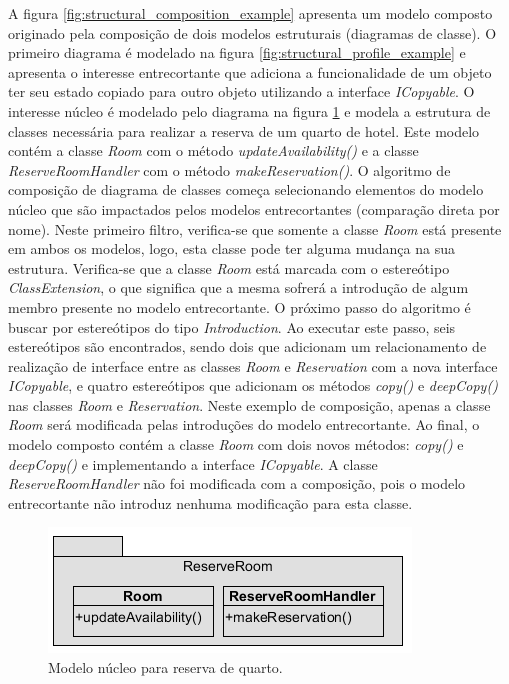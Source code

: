 A figura \ref{fig:structural_composition_example} apresenta um modelo composto originado pela composição de dois modelos estruturais (diagramas de
classe). O primeiro diagrama é modelado na figura \ref{fig:structural_profile_example} e apresenta o interesse entrecortante que adiciona a
funcionalidade de um objeto ter seu estado copiado para outro objeto utilizando a interface \textit{ICopyable}. O interesse núcleo é modelado pelo diagrama na figura
\ref{fig:structural_core_concern_class_diagram} e modela a estrutura de classes necessária para realizar a reserva de um quarto de hotel. Este
modelo contém a classe \textit{Room} com o método \textit{updateAvailability()} e a classe \textit{ReserveRoomHandler} com o
método \textit{makeReservation()}. O algoritmo de composição de diagrama de classes começa selecionando elementos do modelo núcleo que são
impactados pelos modelos entrecortantes (comparação direta por nome). Neste primeiro filtro, verifica-se que somente a classe \textit{Room} está
presente em ambos os modelos, logo, esta classe pode ter alguma mudança na sua estrutura. Verifica-se que a classe \textit{Room} está marcada com o 
estereótipo \textit{ClassExtension}, o que significa que a mesma sofrerá a introdução de algum membro presente no modelo entrecortante. O próximo
passo do algoritmo é buscar por estereótipos do tipo \textit{Introduction}. Ao executar este passo, seis estereótipos são encontrados, sendo dois
que adicionam um relacionamento de realização de interface entre as classes \textit{Room} e \textit{Reservation} com a nova interface
\textit{ICopyable}, e quatro estereótipos que adicionam os métodos \textit{copy()} e \textit{deepCopy()} nas classes \textit{Room} e
\textit{Reservation}. Neste exemplo de composição, apenas a classe \textit{Room} será modificada pelas introduções do modelo entrecortante. Ao final, 
o modelo composto contém a classe \textit{Room} com dois novos métodos: \textit{copy()} e \textit{deepCopy()} e implementando a interface \textit{ICopyable}. 
A classe \textit{ReserveRoomHandler} não foi modificada com a composição, pois o modelo entrecortante não introduz nenhuma modificação para esta
classe.

  \begin{figure}[!h]
	\centering
	\includegraphics{img/structural_core_concern_class_diagram.png}
	\caption{Modelo núcleo para reserva de quarto.}\label{fig:structural_core_concern_class_diagram}
  \end{figure}
    

